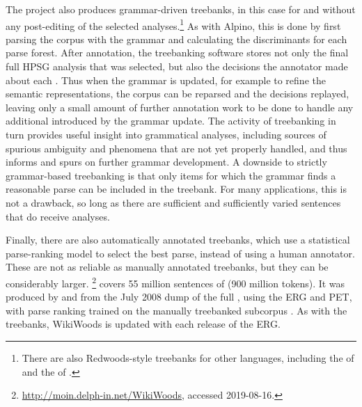 \documentclass[output=paper
 	        ,biblatex
                ,babelshorthands
                ,newtxmath
                ,draftmode
                ,colorlinks, citecolor=brown
]{langscibook}
\begin{document}
The  project \citep{OFTM2004a-u} also produces grammar-driven treebanks, in this case
for  and without any post-editing of the selected analyses.\footnote{There are also
  Redwoods-style treebanks for other languages, including the  of
   \citep{bond:etal:2004} and the  of 
  \citep{marimon:2015}.}  As with Alpino, this is done by first parsing the corpus with the grammar
and calculating the discriminants for each parse forest.  After annotation, the treebanking software
stores not only the final full HPSG analysis that was selected, but also the decisions the
annotator made about each .  Thus when the grammar is updated, for
example to refine the semantic representations, the corpus can be reparsed and the decisions
replayed, leaving only a small amount of further annotation work to be done to handle any additional
 introduced by the grammar update.  The activity of treebanking in turn provides
useful insight into grammatical analyses, including sources of spurious
ambiguity and phenomena that are not yet properly handled, and thus informs
and spurs on further grammar development.  A downside to strictly grammar-based treebanking is that
only items for which the grammar finds a reasonable parse can be included in the treebank. For many
applications, this is not a drawback, so long as there are sufficient and sufficiently varied
sentences that do receive analyses.

Finally, there are also automatically annotated treebanks, which use a statistical parse-ranking model to select the best parse, instead of using a human annotator.  These are not as reliable as manually annotated treebanks, but they can be considerably larger.  \footnote{\url{http://moin.delph-in.net/WikiWoods}, accessed 2019-08-16.}  covers 55 million sentences of  (900 million tokens).  It was produced by \citet{flickinger2010wikiwoods} and \citet{solberg2012wikiwoods} from the July 2008 dump of the full  , using the ERG and PET, with parse ranking trained on the manually treebanked subcorpus  \citep{ytrestol2009wescience}.  As with the  treebanks, WikiWoods is updated with each release of the ERG.%
%
%
%
%
%
\end{document}
